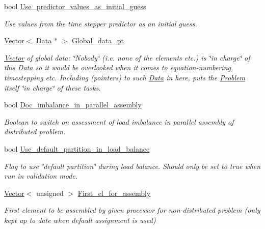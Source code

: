 \begin{DoxyCompactItemize}
bool \hyperlink{classoomph_1_1Problem_afe6f5bb841832b3c4d1f06c2d939f4a6}{Use\+\_\+predictor\+\_\+values\+\_\+as\+\_\+initial\+\_\+guess}
\begin{DoxyCompactList}\small\item\em Use values from the time stepper predictor as an initial guess. \end{DoxyCompactList}\item 
\hyperlink{classoomph_1_1Vector}{Vector}$<$ \hyperlink{classoomph_1_1Data}{Data} $\ast$ $>$ \hyperlink{classoomph_1_1Problem_aa963c98e91d135d31cdcfbe1afa64603}{Global\+\_\+data\+\_\+pt}
\begin{DoxyCompactList}\small\item\em \hyperlink{classoomph_1_1Vector}{Vector} of global data\+: \char`\"{}\+Nobody\char`\"{} (i.\+e. none of the elements etc.) is \char`\"{}in charge\char`\"{} of this \hyperlink{classoomph_1_1Data}{Data} so it would be overlooked when it comes to equation-\/numbering, timestepping etc. Including (pointers) to such \hyperlink{classoomph_1_1Data}{Data} in here, puts the \hyperlink{classoomph_1_1Problem}{Problem} itself \char`\"{}in charge\char`\"{} of these tasks. \end{DoxyCompactList}\item 
bool \hyperlink{classoomph_1_1Problem_a9a20957e3ef4c8142261363c85f6e276}{Doc\+\_\+imbalance\+\_\+in\+\_\+parallel\+\_\+assembly}
\begin{DoxyCompactList}\small\item\em Boolean to switch on assessment of load imbalance in parallel assembly of distributed problem. \end{DoxyCompactList}\item 
bool \hyperlink{classoomph_1_1Problem_a259414329d43257a71790ac2983e32d4}{Use\+\_\+default\+\_\+partition\+\_\+in\+\_\+load\+\_\+balance}
\begin{DoxyCompactList}\small\item\em Flag to use \char`\"{}default partition\char`\"{} during load balance. Should only be set to true when run in validation mode. \end{DoxyCompactList}\item 
\hyperlink{classoomph_1_1Vector}{Vector}$<$ unsigned $>$ \hyperlink{classoomph_1_1Problem_a0caac0918eaaea840238ce83f5be7836}{First\+\_\+el\+\_\+for\+\_\+assembly}
\begin{DoxyCompactList}\small\item\em First element to be assembled by given processor for non-\/distributed problem (only kept up to date when default assignment is used) \end{DoxyCompactList}\item 

\end{DoxyCompactItemize}
